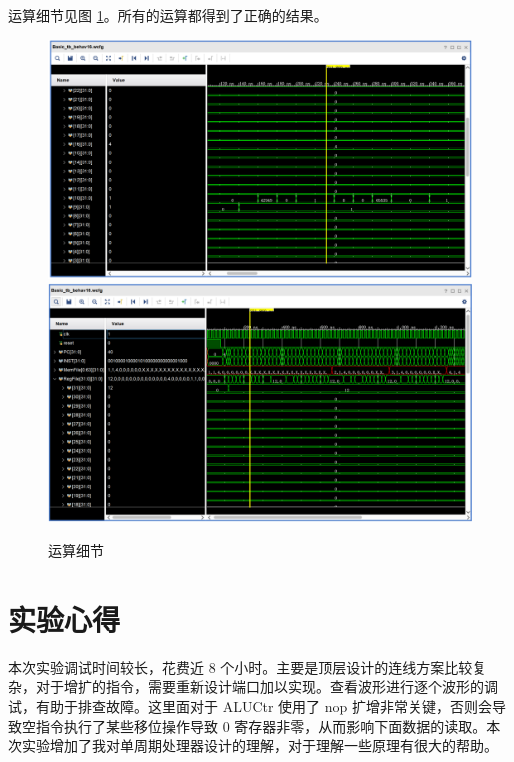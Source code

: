 \documentclass[a4paper,UTF8]{ctexart}
\begin{document}
运算细节见图 \ref{fig:calcde}。所有的运算都得到了正确的结果。

\begin{figure}[h]
    \centering
    \includegraphics[width=\textwidth]{calcdetail.png}
    \includegraphics[width=\textwidth]{memdetail.png}
    \caption{运算细节}
    \label{fig:calcde}
\end{figure}

\section{实验心得}

本次实验调试时间较长，花费近 8 个小时。主要是顶层设计的连线方案比较复杂，对于增扩的指令，需要重新设计端口加以实现。查看波形进行逐个波形的调试，有助于排查故障。这里面对于 ALUCtr 使用了 nop 扩增非常关键，否则会导致空指令执行了某些移位操作导致 0 寄存器非零，从而影响下面数据的读取。本次实验增加了我对单周期处理器设计的理解，对于理解一些原理有很大的帮助。
\end{document}
